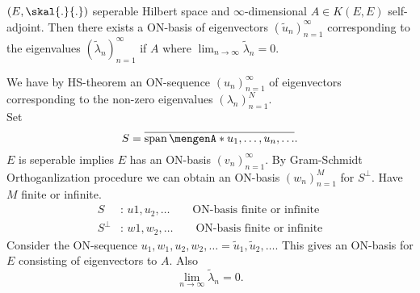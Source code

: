 \begin{theorem}
	$(E,\skal{.}{.})$ seperable Hilbert space and $\infty$-dimensional $A \in K(E,E)$ self-adjoint. Then there exists a ON-basis of eigenvectors $(\tilde u_n)_{n=1}^{\infty}$ corresponding to the eigenvalues $(\tilde \lambda_n)_{n=1}^{\infty}$ if $A$ where $\lim_{n \to \infty} \tilde \lambda_n = 0$.
\end{theorem}
\begin{beweis}
	We have by HS-theorem an ON-sequence $(u_n)_{n=1}^{\infty}$ of eigenvectors corresponding to the non-zero eigenvalues $(\lambda_n)_{n=1}^{N}$. \\
	Set
	\[
		S = \overline{\spn\set{u_1,\dots,u_n, \dots}}.
	\]
	$E$ is seperable implies $E$ has an ON-basis $(v_n)_{n=1}^{\infty}$. By Gram-Schmidt Orthoganlization procedure we can obtain an ON-basis $(w_n)_{n=1}^{M}$ for $S^{\perp}$. Have $M$ finite or infinite. \begin{align*}
		S &:\,u1,u_2, \dots \qquad \text{ON-basis finite or infinite} \\
		S^{\perp} &:\,w1,w_2, \dots \qquad \text{ON-basis finite or infinite}
	\end{align*}
	Consider the ON-sequence $u_1,w_1,u_2,w_2, \dots = \tilde u_1, \tilde u_2, \dots$. This gives an ON-basis for $E$ consisting of eigenvectors to $A$. Also
	\[
		\lim_{n \to \infty}\tilde \lambda_n = 0.
	\]
\end{beweis}